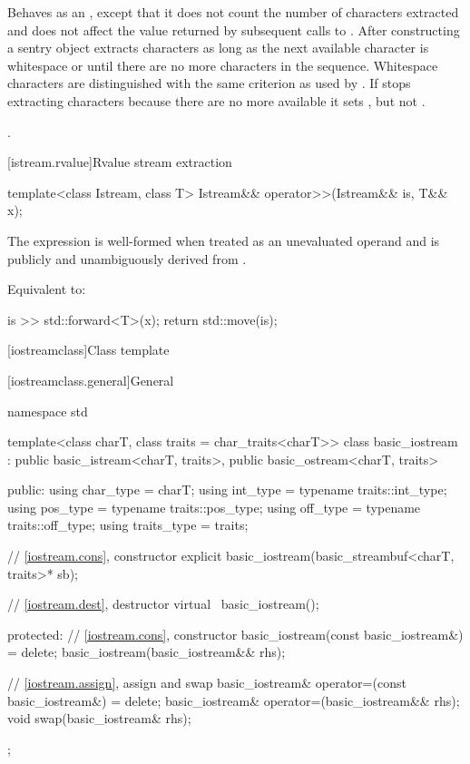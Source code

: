 \begin{itemdescr}
\pnum
\effects
Behaves as an , except that it does not count the number of characters extracted and
does not affect the value returned by subsequent calls to . After
constructing a sentry object extracts characters as long as the next available
character  is whitespace or until there are no more characters in the sequence.
Whitespace characters are distinguished with the same criterion as used by
.
If
stops extracting characters because there are no more available it sets
,
but not
.

\pnum
\returns
{}.
\end{itemdescr}

[istream.rvalue]{Rvalue stream extraction}

%
\begin{itemdecl}
template<class Istream, class T>
  Istream&& operator>>(Istream&& is, T&& x);
\end{itemdecl}

\begin{itemdescr}
\pnum
\constraints
The expression  is well-formed
when treated as an unevaluated operand and
 is publicly and unambiguously derived from .

\pnum
\effects
Equivalent to:
\begin{codeblock}
is >> std::forward<T>(x);
return std::move(is);
\end{codeblock}
\end{itemdescr}

[iostreamclass]{Class template }

[iostreamclass.general]{General}

%
\begin{codeblock}
namespace std {
  template<class charT, class traits = char_traits<charT>>
  class basic_iostream
    : public basic_istream<charT, traits>,
      public basic_ostream<charT, traits> {
  public:
    using char_type   = charT;
    using int_type    = typename traits::int_type;
    using pos_type    = typename traits::pos_type;
    using off_type    = typename traits::off_type;
    using traits_type = traits;

    // \ref{iostream.cons}, constructor
    explicit basic_iostream(basic_streambuf<charT, traits>* sb);

    // \ref{iostream.dest}, destructor
    virtual ~basic_iostream();

  protected:
    // \ref{iostream.cons}, constructor
    basic_iostream(const basic_iostream&) = delete;
    basic_iostream(basic_iostream&& rhs);

    // \ref{iostream.assign}, assign and swap
    basic_iostream& operator=(const basic_iostream&) = delete;
    basic_iostream& operator=(basic_iostream&& rhs);
    void swap(basic_iostream& rhs);
  };
}
\end{codeblock}

